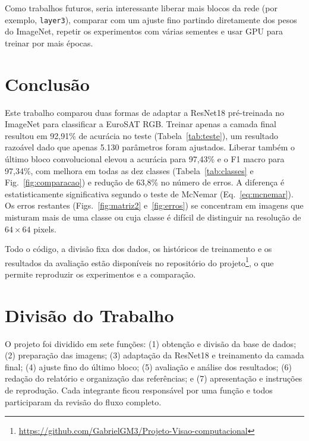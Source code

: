 \documentclass[conference,a4paper]{IEEEtran}
\begin{document}
Como trabalhos futuros, seria interessante liberar mais blocos da rede (por exemplo, \texttt{layer3}), comparar com um ajuste fino partindo diretamente dos pesos do ImageNet, repetir os experimentos com várias sementes e usar GPU para treinar por mais épocas.

\section{Conclusão}
\label{sec:conclusao}

Este trabalho comparou duas formas de adaptar a ResNet18 pré-treinada no ImageNet para classificar a EuroSAT RGB. Treinar apenas a camada final resultou em 92,91\% de acurácia no teste (Tabela~\ref{tab:teste}), um resultado razoável dado que apenas 5.130 parâmetros foram ajustados. Liberar também o último bloco convolucional elevou a acurácia para 97,43\% e o F1 macro para 97,34\%, com melhora em todas as dez classes (Tabela~\ref{tab:classes} e Fig.~\ref{fig:comparacao}) e redução de 63,8\% no número de erros. A diferença é estatisticamente significativa segundo o teste de McNemar (Eq.~\ref{eq:mcnemar}). Os erros restantes (Figs.~\ref{fig:matriz2} e~\ref{fig:erros}) se concentram em imagens que misturam mais de uma classe ou cuja classe é difícil de distinguir na resolução de $64\times64$ pixels.

Todo o código, a divisão fixa dos dados, os históricos de treinamento e os resultados da avaliação estão disponíveis no repositório do projeto\footnote{\url{https://github.com/GabrielGM3/Projeto-Visao-computacional}}, o que permite reproduzir os experimentos e a comparação.

\section*{Divisão do Trabalho}

O projeto foi dividido em sete funções: (1) obtenção e divisão da base de dados; (2) preparação das imagens; (3) adaptação da ResNet18 e treinamento da camada final; (4) ajuste fino do último bloco; (5) avaliação e análise dos resultados; (6) redação do relatório e organização das referências; e (7) apresentação e instruções de reprodução. Cada integrante ficou responsável por uma função e todos participaram da revisão do fluxo completo.



\end{document}

